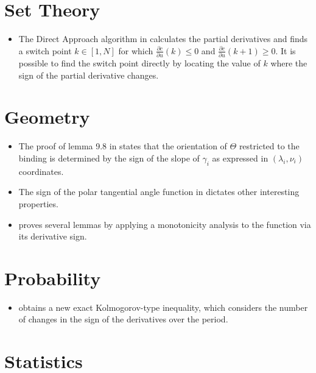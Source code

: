 \documentclass[11pt]{book}
\begin{document}
\section{Set Theory}
\begin{itemize}
\item The Direct Approach algorithm in \cite{chen2017direct}
calculates the partial derivatives and finds a switch point $k\in\left[1,N\right]$
for which $\frac{\partial c}{\partial u}(k)\leq0$ and $\frac{\partial c}{\partial u}\left(k+1\right)\geq0$.
It is possible to find the switch point directly by locating the value
of $k$ where the sign of the partial derivative changes.
\end{itemize}

\section{Geometry}
\begin{itemize}
\item The proof of lemma 9.8 in \cite{kazez2015approximating}
states that the orientation of $\Theta$ restricted to the binding
is determined by the sign of the slope of $\gamma_{i}$ as expressed
in $\left(\lambda_{i},\nu_{i}\right)$ coordinates.
\item The sign of the polar tangential angle function in \cite{miura2020polar}
dictates other interesting properties.
\item \cite{bellet2020symmetry} proves
several lemmas by applying a monotonicity analysis to the function
via its derivative sign.
\end{itemize}

\section{Probability}
\begin{itemize}
\item \cite{kofanov2003kolmogorov}
obtains a new exact Kolmogorov-type inequality, which considers the
number of changes in the sign of the derivatives over the period.
\end{itemize}

\section{Statistics}

\end{document}
